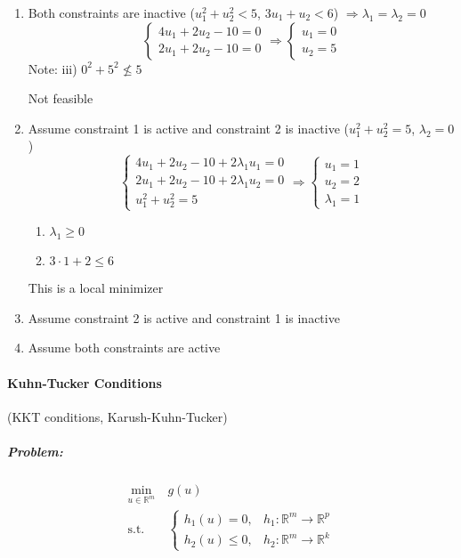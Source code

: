 \documentclass[letterpaper,12pt,titlepage]{report}
\newcommand*\R{\mathbb{R}}
\theoremstyle{plain}
\theoremstyle{definition}
\begin{document}
\begin{enumerate}
\item Both constraints are inactive ($u_1^2 + u_2^2 < 5$, $3u_1 + u_2 < 6$) $\Longrightarrow \lambda_1=\lambda_2=0$
  \[ \begin{cases}
      4u_1 + 2u_2 - 10 = 0 \\
      2u_1 + 2u_2 - 10 = 0
    \end{cases}
    \Longrightarrow
    \begin{cases}
      u_1 = 0 \\
      u_2 = 5
    \end{cases} \]
  Note: iii) $0^2 + 5^2 \nleq 5$

  Not feasible

\item Assume constraint 1 is active and constraint 2 is inactive ($u_1^2 + u_2^2 = 5$, $\lambda_2=0$)
  \[ \begin{cases}
      4u_1 + 2u_2 - 10 + 2\lambda_1u_1 = 0 \\
      2u_1 + 2u_2 - 10 + 2\lambda_1u_2 = 0 \\
      u_1^2 + u_2^2 = 5
    \end{cases}
    \Longrightarrow
    \begin{cases}
      u_1 = 1 \\
      u_2 = 2 \\
      \lambda_1 = 1
    \end{cases} \]
  \begin{enumerate}[label=$\square$\hspace{1pt}\llap{\raisebox{2pt}{$\checkmark$}}]
  \item $\lambda_1 \ge 0$
  \item $3\cdot 1 + 2 \le 6$
  \end{enumerate}
  This is a local minimizer

\item Assume constraint 2 is active and constraint 1 is inactive
\item Assume both constraints are active
\end{enumerate}

\paragraph{Kuhn-Tucker Conditions} (KKT conditions, Karush-Kuhn-Tucker)
\subparagraph{Problem:}
\begin{equation}
  \begin{aligned}
    \min_{u\in\R^m} {}\ & g(u) \\
    \text{s.t. } & \begin{cases}
      h_1(u) = 0, & h_1:\R^m\to\R^p \\
      h_2(u) \le 0, & h_2:\R^m\to\R^k
    \end{cases}
  \end{aligned}
  \label{eq:kkt}
\end{equation}
\end{document}
